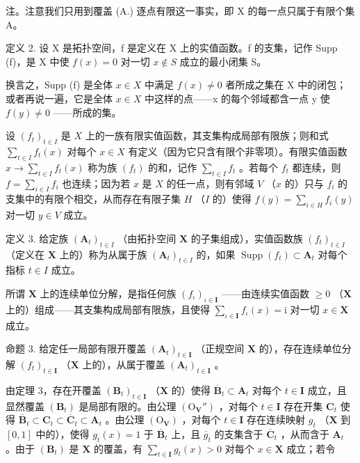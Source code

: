 注。注意我们只用到覆盖 (A.) 逐点有限这一事实，即 X 的每一点只属于有限个集 A。

定义 2. 设 X 是拓扑空间，f 是定义在 X 上的实值函数。f 的支集，记作 Supp (f)，是 X 中使 \(f(x) = 0\) 对一切 \(x \notin S\) 成立的最小闭集 S。

换言之，Supp (f) 是全体 \(x \in X\) 中满足 \(f(x) \neq 0\) 者所成之集在 X 中的闭包；或者再说一遍，它是全体 \(x \in X\) 中这样的点——x 的每个邻域都含一点 y 使 \(f(y) \neq 0\) ——所成的集。

设 \((f_{t})_{t\in I}\) 是 \(X\) 上的一族有限实值函数，其支集构成局部有限族；则和式 \(\sum_{t\in I}f_t(x)\) 对每个 \(x\in X\) 有定义（因为它只含有限个非零项）。有限实值函数 \(x\to \sum_{t\in I}f_t(x)\) 称为族 \((f_{t})\) 的和，记作 \(\sum_{t\in I}f_{t}\) 。若每个 \(f_{t}\) 都连续，则 \(f = \sum_{i \in I} f_i\) 也连续；因为若 \(x\) 是 \(X\) 的任一点，则有邻域 \(V\) （\(x\) 的）只与 \(f_i\) 的支集中的有限个相交，从而存在有限子集 \(H\) （\(I\) 的）使得 \(f(y) = \sum_{i \in H} f_i(y)\) 对一切 \(y \in V\) 成立。

定义 3. 给定族 \((\mathbf{A}_{t})_{t\in I}\) （由拓扑空间 \(\mathbf{X}\) 的子集组成），实值函数族 \((f_t)_{t\in I}\) （定义在 \(\mathbf{X}\) 上的）称为从属于族 \((\mathbf{A}_t)_{t\in I}\) 的，如果 \(\operatorname{Supp}(f_t)\subset \mathbf{A}_t\) 对每个指标 \(t\in I\) 成立。

所谓 \(\mathbf{X}\) 上的连续单位分解，是指任何族 \((f_{\iota})_{\iota \in \mathbf{I}}\) ——由连续实值函数 \(\geqslant 0\) （\(\mathbf{X}\) 上的）组成——其支集构成局部有限族，且使得 \(\sum_{\iota \in \mathbf{I}} f_{\iota}(x) = \mathrm{i}\) 对一切 \(x \in \mathbf{X}\) 成立。

命题 3. 给定任一局部有限开覆盖 \((\mathbf{A}_t)_{t \in \mathbf{I}}\) （正规空间 \(\mathbf{X}\) 的），存在连续单位分解 \((f_t)_{t \in \mathbf{I}}\) （\(\mathbf{X}\) 上的），从属于覆盖 \((\mathbf{A}_t)_{t \in \mathbf{I}}\) 。

由定理 3，存在开覆盖 \((\mathbf{B}_t)_{t \in \mathbf{I}}\) （\(\mathbf{X}\) 的）使得 \(\overline{\mathbf{B}}_t \subset \mathbf{A}_t\) 对每个 \(t \in \mathbf{I}\) 成立，且显然覆盖 \((\mathbf{B}_t)\) 是局部有限的。由公理 \((\mathrm{O}_{\mathbf{V}}'')\) ，对每个 \(t \in \mathbf{I}\) 存在开集 \(\mathbf{C}_t\) 使得 \(\overline{\mathbf{B}}_t \subset \mathbf{C}_t \subset \overline{\mathbf{C}}_t \subset \mathbf{A}_t\) 。由公理 \((\mathrm{O}_{\mathbf{V}})\) ，对每个 \(t \in \mathbf{I}\) 存在连续映射 \(g_t\) （\(\mathbf{X}\) 到 \([0,1]\) 中的），使得 \(g_t(x) = 1\) 于 \(\overline{\mathbf{B}}_t\) 上，且 \(\overline{g}_t\) 的支集含于 \(\overline{\mathbf{C}}_t\) ，从而含于 \(\mathbf{A}_t\) 。由于 \((\mathbf{B}_t)\) 是 \(\mathbf{X}\) 的覆盖，有 \(\sum_{t \in \mathbf{I}} g_t(x) > 0\) 对每个 \(x \in \mathbf{X}\) 成立；若令

